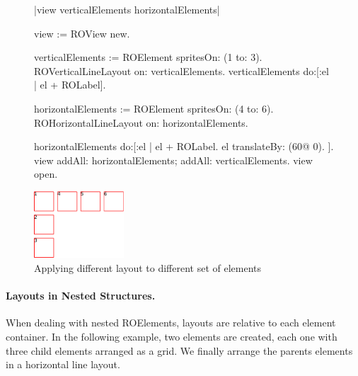 \documentclass[a4paper,10pt,twoside]{book}
\begin{document}
\begin{figure}[H]
\label{fig:differentLayouts}
\vspace{0pt}
	\begin{minipage}[t]{1\textwidth}
     \begin{code}{}
|view verticalElements horizontalElements|

view := ROView new.

verticalElements := ROElement spritesOn: (1 to: 3).
ROVerticalLineLayout on: verticalElements.
verticalElements do:[:el | el + ROLabel].
	
horizontalElements := ROElement spritesOn: (4 to: 6).
ROHorizontalLineLayout on: horizontalElements.
	
horizontalElements do:[:el |
	el + ROLabel.
	el translateBy: (60@ 0).
].	
view 
	addAll: horizontalElements; 
	addAll: verticalElements.
view open.
  \end{code}
   \end{minipage}  

\hfill
   \begin{minipage}[t]{1\textwidth}
      \vspace{0pt} \raggedright
       \centering
		\includegraphics[width=0.3\textwidth]{differentLayouts} 
   \end{minipage}
\caption{Applying different layout to different set of elements}
\end{figure} 



\paragraph{Layouts in Nested Structures.}
When dealing with nested ROElements, layouts are relative to each element container. In the following example, two elements are created, each one with three child elements arranged as a grid. We finally arrange the parents elements in a horizontal line layout.
\end{document}
